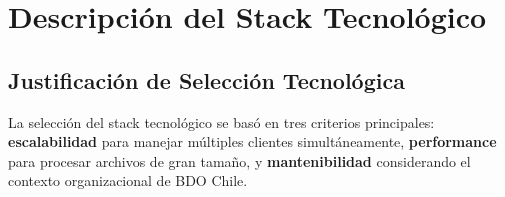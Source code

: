 
\section{Descripción del Stack Tecnológico}

\subsection{Justificación de Selección Tecnológica}

La selección del stack tecnológico se basó en tres criterios principales: \textbf{escalabilidad} para manejar múltiples clientes simultáneamente, \textbf{performance} para procesar archivos de gran tamaño, y \textbf{mantenibilidad} considerando el contexto organizacional de BDO Chile.

